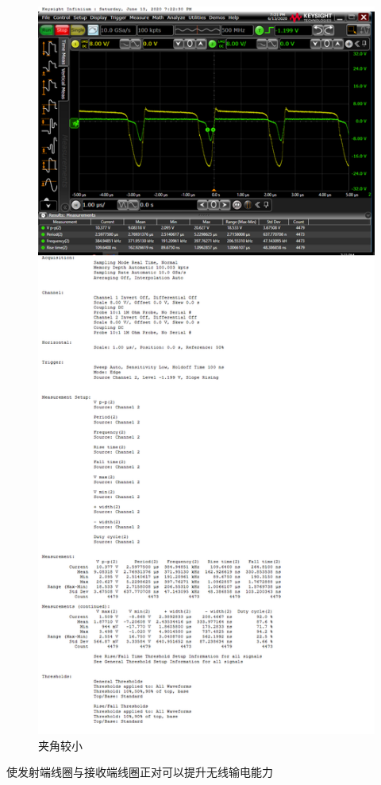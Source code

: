 \documentclass[conference]{IEEEtran}
\theoremstyle{break}
\begin{document}
\begin{figure}[htbp]
        \centerline{\includegraphics[scale=0.1]{角度2.png}}
        \caption{夹角较小}
        \label{fig}
        \end{figure}   
使发射端线圈与接收端线圈正对可以提升无线输电能力
\end{document}
